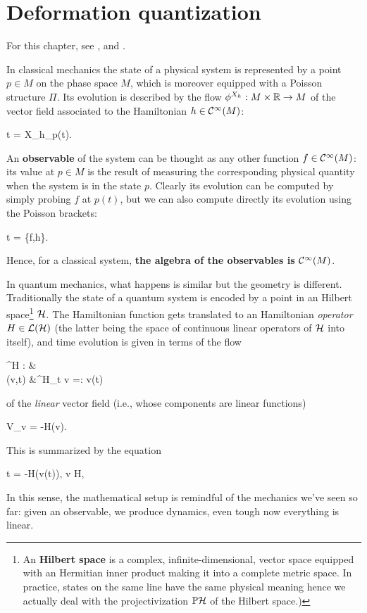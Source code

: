 \documentclass[main.tex]{subfiles}
\begin{document}
\chapter{Deformation quantization}
For this chapter, see \cite{cattaneo2004formality}, \cite{kontsevich2003deformation} and \cite{gerstenhaber1964deformation}.

In classical mechanics the state of a physical system is represented by a point $p \in M$ on the phase space $M$, which is moreover equipped with a Poisson structure $\Pi$. Its evolution is described by the flow $\phi^{X_h}: M \times \mathbb{R} \to M$ of the vector field associated to the Hamiltonian $h \in \mathcal{C}^\infty(M)$:
\begin{eqalign}
	t = X_h\vert_{p(t)}.
\end{eqalign}
An \textbf{observable} of the system can be thought as any other function $f \in \mathcal{C}^\infty(M)$: its value at $p \in M$ is the result of measuring the corresponding physical quantity when the system is in the state $p$. Clearly its evolution can be computed by simply probing $f$ at $p(t)$, but we can also compute directly its evolution using the Poisson brackets:
\begin{eqalign}
\label{eq:classical_evolution_eq}
	t = \{f,h\}.
\end{eqalign}
Hence, for a classical system, \textbf{the algebra of the observables is $\mathcal{C}^\infty(M)$}.

In quantum mechanics, what happens is similar but the geometry is different. Traditionally the state of a quantum system is encoded by a point in an Hilbert space\footnote{An \textbf{Hilbert space} is a complex, infinite-dimensional, vector space equipped with an Hermitian inner product making it into a complete metric space. In practice, states on the same line have the same physical meaning hence we actually deal with the projectivization $\mathbb{P} \mathcal{H}$ of the Hilbert space.)} $\mathcal{H}$. The Hamiltonian function gets translated to an Hamiltonian \emph{operator} $H \in \mathcal{L}(\mathcal{H})$ (the latter being the space of continuous linear operators of $\mathcal{H}$ into itself), and time evolution is given in terms of the flow
\begin{eqalign}
	\phi^H : \hilbert \times \R &\longto \hilbert\\
	(v,t) &\longmapsto \phi^H_t v =: v(t)
\end{eqalign}
of the \emph{linear} vector field (i.e., whose components are linear functions)
\begin{eqalign}
	V\vert_v = -\planck H(v).
\end{eqalign}
This is summarized by the equation
\begin{eqalign}
\label{eq:state_evolution}
	t = -\planck H(v(t)), \quad \forall v \in H,
\end{eqalign}
In this sense, the mathematical setup is remindful of the mechanics we've seen so far: given an observable, we produce dynamics, even tough now everything is linear.
\end{document}
